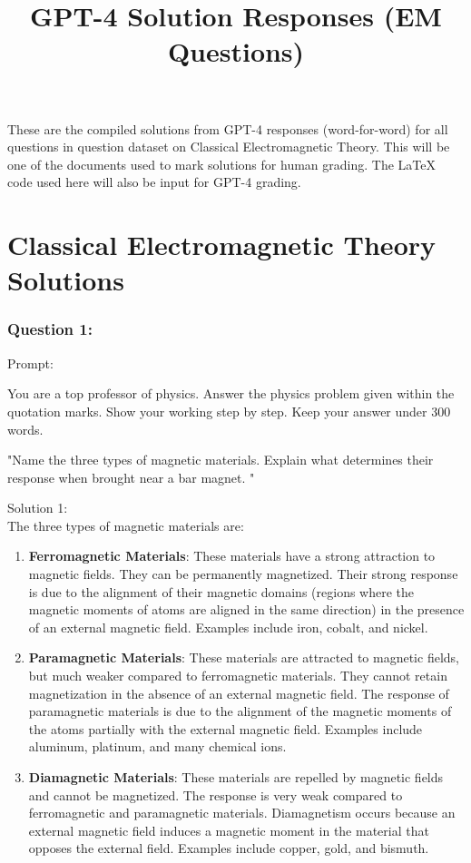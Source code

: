 \documentclass[a4paper,11pt]{article}
\begin{document}
\title{GPT-4 Solution Responses (EM Questions)}
\author{}
\date{}
\maketitle

\noindent These are the compiled solutions from GPT-4 responses (word-for-word) for all questions in question dataset on Classical Electromagnetic Theory. This will be one of the documents used to mark solutions for human grading. The LaTeX code used here will also be input for GPT-4 grading. 

\section{Classical Electromagnetic Theory Solutions}

\subsubsection*{Question 1:}

Prompt:
\begin{spverbatim}
    You are a top professor of physics. Answer the physics problem given within the quotation marks. Show your working step by step. Keep your answer under 300 words.

    "Name the three types of magnetic materials. Explain what determines their response when brought near a bar magnet. "
\end{spverbatim} 

\bigskip

\noindent Solution 1: \\

The three types of magnetic materials are:

\begin{enumerate}
    \item \textbf{Ferromagnetic Materials}: These materials have a strong attraction to magnetic fields. They can be permanently magnetized. Their strong response is due to the alignment of their magnetic domains (regions where the magnetic moments of atoms are aligned in the same direction) in the presence of an external magnetic field. Examples include iron, cobalt, and nickel.
    \item \textbf{Paramagnetic Materials}: These materials are attracted to magnetic fields, but much weaker compared to ferromagnetic materials. They cannot retain magnetization in the absence of an external magnetic field. The response of paramagnetic materials is due to the alignment of the magnetic moments of the atoms partially with the external magnetic field. Examples include aluminum, platinum, and many chemical ions.
    \item \textbf{Diamagnetic Materials}: These materials are repelled by magnetic fields and cannot be magnetized. The response is very weak compared to ferromagnetic and paramagnetic materials. Diamagnetism occurs because an external magnetic field induces a magnetic moment in the material that opposes the external field. Examples include copper, gold, and bismuth.
\end{enumerate}
\end{document}
